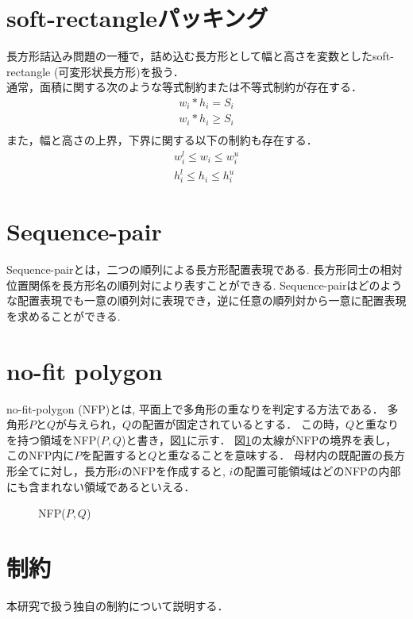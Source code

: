 \section{soft-rectangleパッキング}
長方形詰込み問題の一種で，詰め込む長方形として幅と高さを変数としたsoft-rectangle (可変形状長方形)を扱う．\\
通常，面積に関する次のような等式制約または不等式制約が存在する．\\
\begin{eqnarray}
    w_i * h_i = S_i \\
    w_i * h_i \geq S_i \\
\end{eqnarray}
また，幅と高さの上界，下界に関する以下の制約も存在する．
\begin{eqnarray}
    w_i^l \leq w_i \leq w_i^u \\
    h_i^l \leq h_i \leq h_i^u
\end{eqnarray}

\section{Sequence-pair}
Sequence-pairとは，二つの順列による長方形配置表現である. 
長方形同士の相対位置関係を長方形名の順列対により表すことができる. 
Sequence-pairはどのような配置表現でも一意の順列対に表現でき，逆に任意の順列対から一意に配置表現を求めることができる. 


\section{no-fit polygon}
no-fit-polygon (NFP)とは, 平面上で多角形の重なりを判定する方法である．
多角形$P$と$Q$が与えられ，$Q$の配置が固定されているとする．
この時，$Q$と重なりを持つ領域をNFP($P,Q$)と書き，図\ref{figure31}に示す．
図\ref{figure31}の太線がNFPの境界を表し，このNFP内に$P$を配置すると$Q$と重なることを意味する．
母材内の既配置の長方形全てに対し，長方形$i$のNFPを作成すると, $i$の配置可能領域はどのNFPの内部にも含まれない領域であるといえる．

\begin{figure}
    \label{figure31}
    \caption{NFP($P,Q$)}
\end{figure}


\section{制約}
本研究で扱う独自の制約について説明する．
